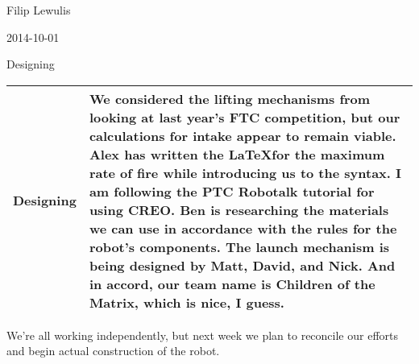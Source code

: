 Filip Lewulis

2014-10-01

Designing

\begin{tabular}{|p{2cm}|p{8cm}|}
\hline
 Designing&
 We considered the lifting mechanisms from looking at last year's FTC competition,
 but our calculations for intake appear to remain viable. Alex has written the \LaTeX for
 the maximum rate of fire while introducing us to the syntax. I am following the PTC Robotalk
 tutorial for using CREO. Ben is researching the materials we can use in accordance with the
 rules for the robot's components. The launch mechanism is being designed by Matt, David, and Nick.
 And in accord, our team name is \textbf{Children of the Matrix}, which is nice, I guess.
 \\
 \hline
\end{tabular}

We're all working independently, but next week we plan to reconcile our efforts and begin
actual construction of the robot.
